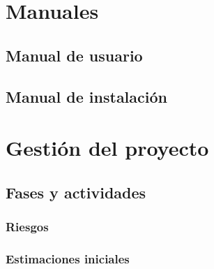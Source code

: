 \documentclass[10pt,spanish]{article}
\begin{document}
\section{Manuales}

\blindtext
\subsection{Manual de usuario}

\blindtext
\subsection{Manual de instalación}

\blindtext

\section{Gestión del proyecto}

\blindtext
\subsection{Fases y actividades}

\blindtext
\subsubsection{Riesgos}

\blindtext
\subsubsection{Estimaciones iniciales}

\blindtext
\end{document}
